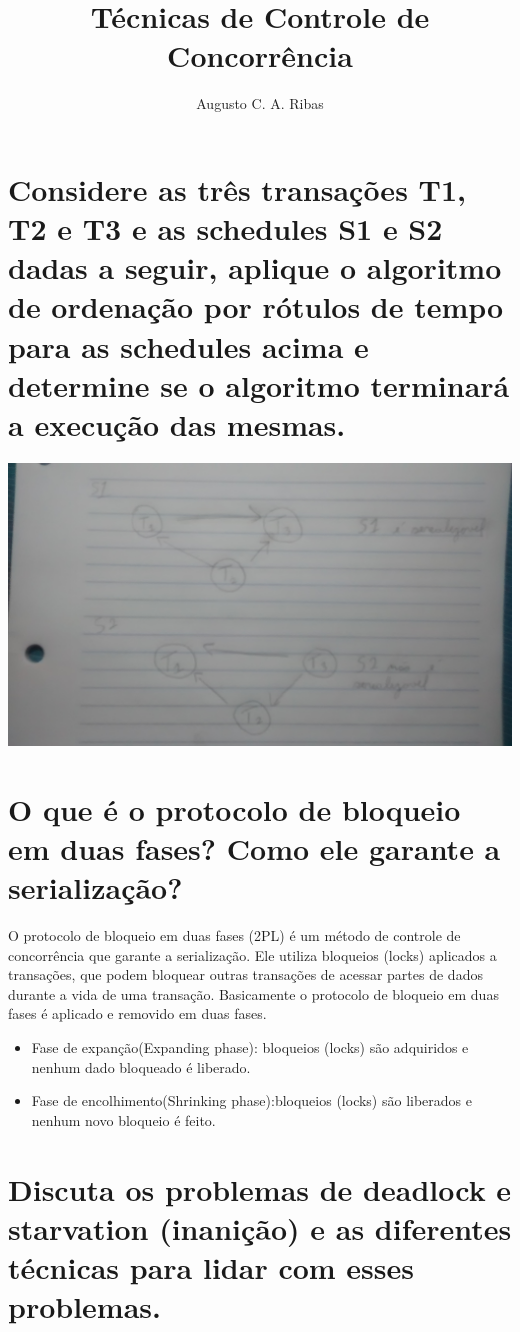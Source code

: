 \documentclass[a4paper,10pt]{article}
\title{Técnicas de Controle de Concorrência
}
\author{Augusto C. A. Ribas}
\begin{document}
\maketitle

\section{Considere as três transações T1, T2 e T3 e as schedules S1 e S2 dadas a seguir, aplique o algoritmo de ordenação por rótulos de tempo para as schedules acima e
determine se o algoritmo terminará a execução das mesmas.}

\includegraphics[width=1\textwidth]{IMG_20141105_214852194}

\section{O que é o protocolo de bloqueio em duas fases? Como ele garante a serialização?}
O protocolo de bloqueio em duas fases (2PL) é um método de controle de concorrência que garante a serialização. Ele utiliza bloqueios (locks) aplicados a transações, que podem bloquear outras transações de acessar partes de dados durante a vida de uma transação.
Basicamente o protocolo de bloqueio em duas fases é aplicado e removido em duas fases.

\begin{itemize}
\item Fase de expanção(Expanding phase): bloqueios (locks) são adquiridos e nenhum dado bloqueado é liberado.
\item Fase de encolhimento(Shrinking phase):bloqueios (locks) são liberados e nenhum novo bloqueio é feito.
\end{itemize}



\section{Discuta os problemas de deadlock e starvation (inanição) e as diferentes técnicas para lidar com esses problemas.}
\end{document}

